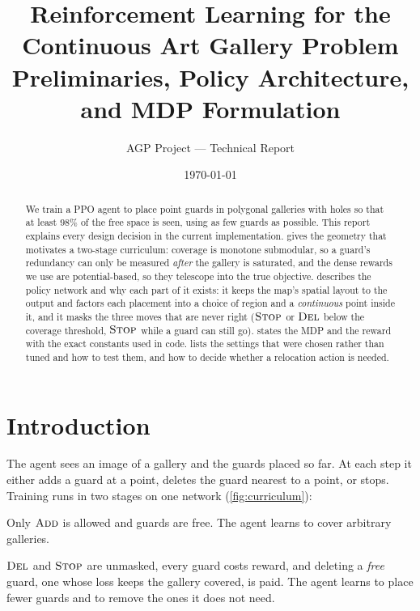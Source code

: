 \documentclass[11pt,a4paper]{article}
\title{\bfseries Reinforcement Learning for the Continuous Art Gallery Problem\\[4pt]
\large Preliminaries, Policy Architecture, and MDP Formulation}
\author{AGP Project --- Technical Report}
\date{\today}
\begin{document}
\maketitle

\begin{abstract}
\noindent
We train a PPO agent to place point guards in polygonal galleries with holes so that at
least $98\%$ of the free space is seen, using as few guards as possible. This report
explains every design decision in the current implementation.  gives the
geometry that motivates a two-stage curriculum: coverage is monotone submodular, so a
guard's redundancy can only be measured \emph{after} the gallery is saturated, and the
dense rewards we use are potential-based, so they telescope into the true objective.
 describes the policy network and why each part of it exists: it keeps the
map's spatial layout to the output and factors each placement into a choice of region and a
\emph{continuous} point inside it, and it masks the three moves that are never right ($\textsc{Stop}$
or $\textsc{Del}$ below the coverage threshold, $\textsc{Stop}$ while a guard can still go).
 states the MDP and the reward with the exact constants used in code.
 lists the settings that were chosen rather than tuned and how to test them,
and how to decide whether a relocation action is needed.
\end{abstract}

\tableofcontents

\section{Introduction}

The agent sees an image of a gallery and the guards placed so far. At each step it either
adds a guard at a point, deletes the guard nearest to a point, or stops. Training runs in
two stages on one network (\cref{fig:curriculum}):

\begin{description}[leftmargin=1.6em]
  \item[\stageI{} (stage 1).] Only $\textsc{Add}$ is allowed and guards are free. The agent learns
        to cover arbitrary galleries.
  \item[\stageII{} (stage 2).] $\textsc{Del}$ and $\textsc{Stop}$ are unmasked, every guard costs reward,
        and deleting a \emph{free} guard, one whose loss keeps the gallery covered, is paid.
        The agent learns to place fewer guards and to remove the ones it does not need.
\end{description}
\end{document}
